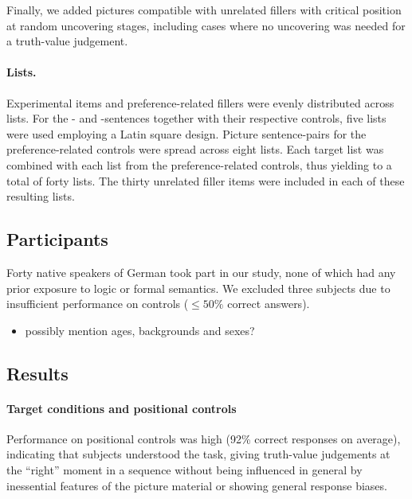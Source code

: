\documentclass[fleqn,reqno,10pt,draft]{article}
\newcommand{\as}{\acro{as}}
\renewcommand{\es}{\acro{es}}
\begin{document}
Finally, we added pictures compatible with unrelated fillers with
critical position at random uncovering stages, including cases where
no uncovering was needed for a truth-value judgement.

\paragraph{Lists.}
Experimental items and preference-related fillers were evenly
distributed across lists. For the \as- and \es-sentences together with
their respective controls, five lists were used employing a Latin
square design. Picture sentence-pairs for the preference-related
controls were spread across eight lists. Each target list was combined
with each list from the preference-related controls, thus yielding to
a total of forty lists. The thirty unrelated filler items were
included in each of these resulting lists.


\subsection{Participants}
\label{sec:participants} 

Forty native speakers of German took part in our study, none of which had
any prior exposure to logic or formal semantics. We excluded three
subjects due to insufficient performance on controls ($\le 50\%$
correct answers). 

\begin{itemize}
\item possibly mention ages, backgrounds and sexes?
\end{itemize}


\subsection{Results}
\label{sec:results}

\paragraph{Target conditions and positional controls}
Performance on positional controls was high (92\% correct
responses on average), indicating that subjects understood the task,
giving truth-value judgements at the ``right'' moment in a sequence
without being influenced in general by inessential features of the
picture material or showing general response biases.
\end{document}
